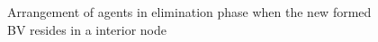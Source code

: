 \begin{itemize}
\begin{figure} [H]
      \hspace{1in} 
  \caption{Arrangement of agents in elimination phase when the new formed BV resides in a interior node} 
  \label{fig:subfigmesh1} %
\end{figure}



\end{itemize}
